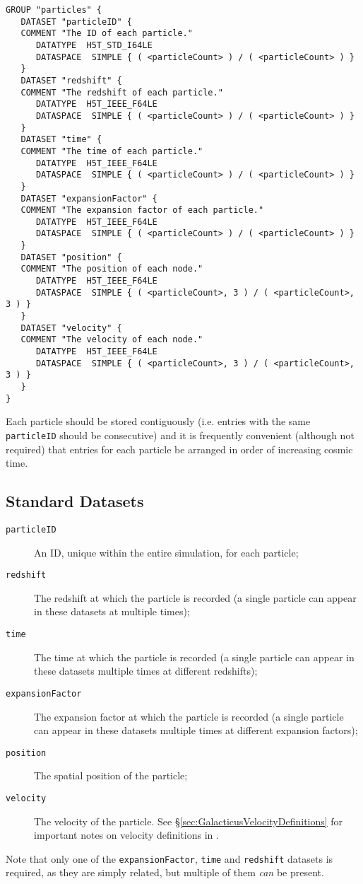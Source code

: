 \begin{verbatim}
GROUP "particles" {
   DATASET "particleID" {
   COMMENT "The ID of each particle."
      DATATYPE  H5T_STD_I64LE
      DATASPACE  SIMPLE { ( <particleCount> ) / ( <particleCount> ) }
   }
   DATASET "redshift" {
   COMMENT "The redshift of each particle."
      DATATYPE  H5T_IEEE_F64LE
      DATASPACE  SIMPLE { ( <particleCount> ) / ( <particleCount> ) }
   }
   DATASET "time" {
   COMMENT "The time of each particle."
      DATATYPE  H5T_IEEE_F64LE
      DATASPACE  SIMPLE { ( <particleCount> ) / ( <particleCount> ) }
   }
   DATASET "expansionFactor" {
   COMMENT "The expansion factor of each particle."
      DATATYPE  H5T_IEEE_F64LE
      DATASPACE  SIMPLE { ( <particleCount> ) / ( <particleCount> ) }
   }
   DATASET "position" {
   COMMENT "The position of each node."
      DATATYPE  H5T_IEEE_F64LE
      DATASPACE  SIMPLE { ( <particleCount>, 3 ) / ( <particleCount>, 3 ) }
   }
   DATASET "velocity" {
   COMMENT "The velocity of each node."
      DATATYPE  H5T_IEEE_F64LE
      DATASPACE  SIMPLE { ( <particleCount>, 3 ) / ( <particleCount>, 3 ) }
   }
}
\end{verbatim}

Each particle should be stored contiguously (i.e. entries with the same {\tt particleID} should be consecutive) and it is frequently convenient (although not required) that entries for each particle be arranged in order of increasing cosmic time.

\subsection{Standard Datasets}

\begin{description}
 \item [{\tt particleID}] An ID, unique within the entire simulation, for each particle;
 \item [{\tt redshift}] The redshift at which the particle is recorded (a single particle can appear in these datasets at multiple times);
 \item [{\tt time}] The time at which the particle is recorded (a single particle can appear in these datasets multiple times at different redshifts);
 \item [{\tt expansionFactor}] The expansion factor at which the particle is recorded (a single particle can appear in these datasets multiple times at different expansion factors);
 \item [{\tt position}] The spatial position of the particle;
 \item [{\tt velocity}] The velocity of the particle. See \S\ref{sec:GalacticusVelocityDefinitions} for important notes on velocity definitions in \glc.
\end{description}

Note that only one of the {\tt expansionFactor}, {\tt time} and {\tt redshift} datasets is required, as they are simply related, but multiple of them \emph{can} be present.
